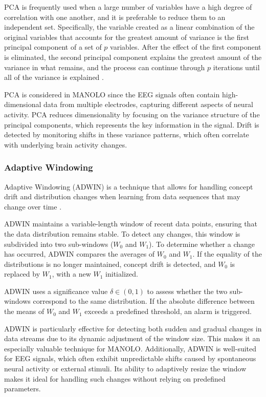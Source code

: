 PCA is frequently used when a large number of variables have a high degree of correlation with one another, and it is preferable to reduce them to an independent set. Specifically, the variable created as a linear combination of the original variables that accounts for the greatest amount of variance is the first principal component of a set of \( p \) variables. After the effect of the first component is eliminated, the second principal component explains the greatest amount of the variance in what remains, and the process can continue through \( p \) iterations until all of the variance is explained \cite{jolliffe2016principal}\cite{shao2014prototype}.

PCA is considered in MANOLO since the EEG signals often contain high-dimensional data from multiple electrodes, capturing different aspects of neural activity. PCA reduces dimensionality by focusing on the variance structure of the principal components, which represents the key information in the signal. Drift is detected by monitoring shifts in these variance patterns, which often correlate with underlying brain activity changes.

\subsubsection{Adaptive Windowing}

Adaptive Windowing (ADWIN) \cite{bifet2007learning} is a technique that allows for handling concept drift and distribution changes when learning from data sequences that may change over time \cite{sun2016online}. 

ADWIN maintains a variable-length window of recent data points, ensuring that the data distribution remains stable. To detect any changes, this window is subdivided into two sub-windows ($W_0$ and $W_1$). To determine whether a change has occurred, ADWIN compares the averages of $W_0$ and $W_1$. If the equality of the distributions is no longer maintained, concept drift is detected, and $W_0$ is replaced by $W_1$, with a new $W_1$ initialized.

ADWIN uses a significance value \(\delta \in (0,1)\) to assess whether the two sub-windows correspond to the same distribution. If the absolute difference between the means of $W_0$ and $W_1$ exceeds a predefined threshold, an alarm is triggered. 

ADWIN is particularly effective for detecting both sudden and gradual changes in data streams due to its dynamic adjustment of the window size. This makes it an especially valuable technique for MANOLO. Additionally, ADWIN is well-suited for EEG signals, which often exhibit unpredictable shifts caused by spontaneous neural activity or external stimuli. Its ability to adaptively resize the window makes it ideal for handling such changes without relying on predefined parameters.


















